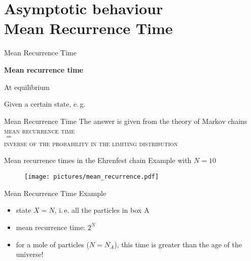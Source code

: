   \section{Asymptotic behaviour\\\small{Mean Recurrence Time}}
  \begin{frame}{Mean Recurrence Time}
    \begin{center}
      \Large \textbf{Mean recurrence time}
    \end{center}
    \alert<3>{At equilibrium}

    Given a certain state, e.\,g.

    \begin{figure}
      
    \end{figure}


    \begin{figure}
    \end{figure}
    
  \end{frame}

  \begin{frame}{Mean Recurrence Time}
    \centering
    The answer is given from the theory of Markov chains\\
    \vspace{20pt}
    \Large
    \alert{\textsc{mean recurrence time}}\\ \alert{$=$} \\
    \large
    \alert{\textsc{inverse of the probability in the limiting distribution}}
  \end{frame}

  \begin{frame}{Mean recurrence times in the Ehrenfest chain}
    \vspace{30pt}
    Example with $N = 10$
    \begin{figure}
      \texttt{[image: pictures/mean\_recurrence.pdf]}
    \end{figure}
  \end{frame}

  \begin{frame}{Mean Recurrence Time}
    Example
    \begin{itemize}
      \item state $X = N$, i.\,e. all the particles in box A
    \end{itemize}

    \begin{figure}
      
    \end{figure}

    \begin{itemize}
      \item mean recurrence time: \alert{$2^N$}
      \item for a mole of particles ($N = N_A$), this time is greater than the age of the universe!
    \end{itemize}
  \end{frame}

